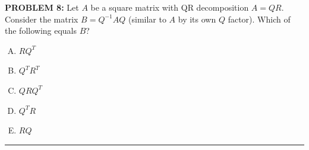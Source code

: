 \documentclass[12pt]{amsart}
\newcommand{\divider}{
  \vspace{-1em} %
  \noindent
  \raisebox{-0.15ex}{\textbullet}%
  \hspace{0.5em}%
  \rule[0.5ex]{0.95\textwidth}{1.0pt}%
  \hspace{0.5em}%
  \raisebox{-0.15ex}{\textbullet}%
  \vspace{0em} %
}
\begin{document}
\newpage 


{\bf PROBLEM 8:}
Let $A$ be a square matrix with QR decomposition $A = QR$.
Consider the matrix $B = Q^{-1}AQ$ (similar to $A$ by its own $Q$ factor).
Which of the following equals $B$?
%
\begin{enumerate}[(A)]
\item $RQ^T$
\item $Q^TR^T$
\item $QRQ^T$ 
\item $Q^TR$ 
\item $RQ$ 
\end{enumerate}
%
%
\divider
\end{document}
